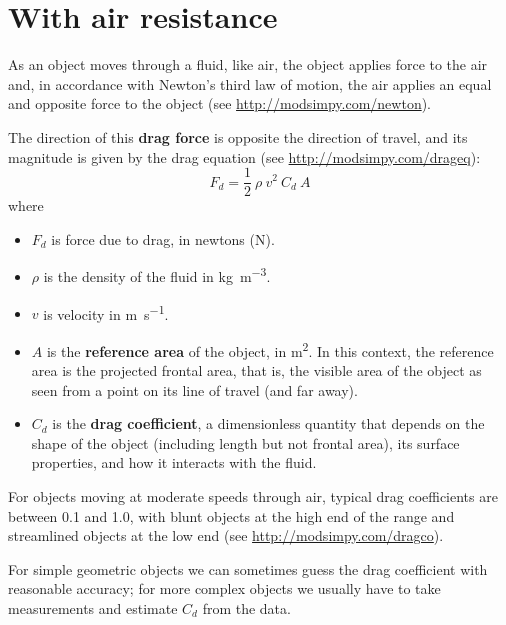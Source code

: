 \documentclass[12pt]{book}
\theoremstyle{exercise}
\begin{document}
\section{With air resistance}
\label{drag}

As an object moves through a fluid, like air, the object applies force to the air and, in accordance with Newton's third law of motion, the air applies an equal and opposite force to the object (see \url{http://modsimpy.com/newton}).

The direction of this {\bf drag force} is opposite the direction of travel, and its magnitude is given by the drag equation (see \url{http://modsimpy.com/drageq}):
%
\[ F_d = \frac{1}{2}~\rho~v^2~C_d~A \]
%
where

\begin{itemize}

\item $F_d$ is force due to drag, in newtons (\si{\newton}).

\item $\rho$ is the density of the fluid in \si{\kg\per\meter\cubed}.

\item $v$ is velocity in \si{\meter\per\second}.

\item $A$ is the {\bf reference area} of the object, in \si{\meter\squared}.  In this context, the reference area is the projected frontal area, that is, the visible area of the object as seen from a point on its line of travel (and far away).

\item $C_d$ is the {\bf drag coefficient}, a dimensionless quantity that depends on the shape of the object (including length but not frontal area), its surface properties, and how it interacts with the fluid.

\end{itemize}

For objects moving at moderate speeds through air, typical drag coefficients are between 0.1 and 1.0, with blunt objects at the high end of the range and streamlined objects at the low end (see \url{http://modsimpy.com/dragco}).

For simple geometric objects we can sometimes guess the drag coefficient with reasonable accuracy; for more complex objects we usually have to take measurements and estimate $C_d$ from the data.
\end{document}
